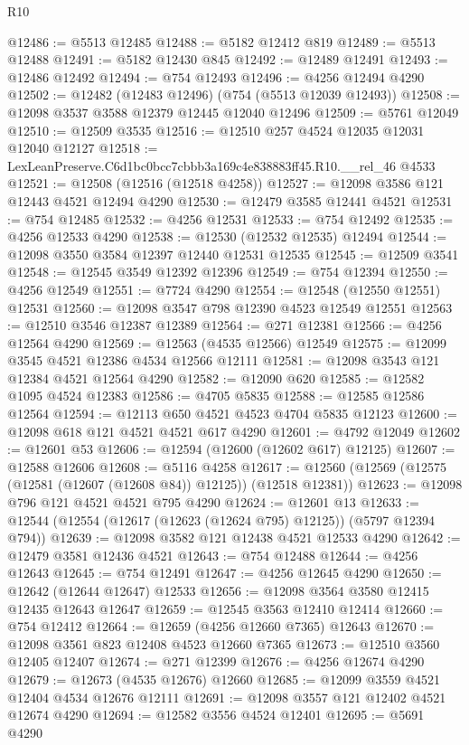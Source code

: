 \begin{lexlean}{R10}
\begin{coremodule}
@12486 := @5513 @12485
@12488 := @5182 @12412 @819
@12489 := @5513 @12488
@12491 := @5182 @12430 @845
@12492 := @12489 @12491
@12493 := @12486 @12492
@12494 := @754 @12493
@12496 := @4256 @12494 @4290
@12502 := @12482 (@12483 @12496) (@754 (@5513 @12039 @12493))
@12508 := @12098 @3537 @3588 @12379 @12445 @12040 @12496
@12509 := @5761 @12049
@12510 := @12509 @3535
@12516 := @12510 @257 @4524 @12035 @12031 @12040 @12127
@12518 := LexLeanPreserve.C6d1bc0bcc7cbbb3a169c4e838883ff45.R10.__rel_46 @4533
@12521 := @12508 (@12516 (@12518 @4258))
@12527 := @12098 @3586 @121 @12443 @4521 @12494 @4290
@12530 := @12479 @3585 @12441 @4521
@12531 := @754 @12485
@12532 := @4256 @12531
@12533 := @754 @12492
@12535 := @4256 @12533 @4290
@12538 := @12530 (@12532 @12535) @12494
@12544 := @12098 @3550 @3584 @12397 @12440 @12531 @12535
@12545 := @12509 @3541
@12548 := @12545 @3549 @12392 @12396
@12549 := @754 @12394
@12550 := @4256 @12549
@12551 := @7724 @4290
@12554 := @12548 (@12550 @12551) @12531
@12560 := @12098 @3547 @798 @12390 @4523 @12549 @12551
@12563 := @12510 @3546 @12387 @12389
@12564 := @271 @12381
@12566 := @4256 @12564 @4290
@12569 := @12563 (@4535 @12566) @12549
@12575 := @12099 @3545 @4521 @12386 @4534 @12566 @12111
@12581 := @12098 @3543 @121 @12384 @4521 @12564 @4290
@12582 := @12090 @620
@12585 := @12582 @1095 @4524 @12383
@12586 := @4705 @5835
@12588 := @12585 @12586 @12564
@12594 := @12113 @650 @4521 @4523 @4704 @5835 @12123
@12600 := @12098 @618 @121 @4521 @4521 @617 @4290
@12601 := @4792 @12049
@12602 := @12601 @53
@12606 := @12594 (@12600 (@12602 @617) @12125)
@12607 := @12588 @12606
@12608 := @5116 @4258
@12617 := @12560 (@12569 (@12575 (@12581 (@12607 (@12608 @84)) @12125)) (@12518 @12381))
@12623 := @12098 @796 @121 @4521 @4521 @795 @4290
@12624 := @12601 @13
@12633 := @12544 (@12554 (@12617 (@12623 (@12624 @795) @12125)) (@5797 @12394 @794))
@12639 := @12098 @3582 @121 @12438 @4521 @12533 @4290
@12642 := @12479 @3581 @12436 @4521
@12643 := @754 @12488
@12644 := @4256 @12643
@12645 := @754 @12491
@12647 := @4256 @12645 @4290
@12650 := @12642 (@12644 @12647) @12533
@12656 := @12098 @3564 @3580 @12415 @12435 @12643 @12647
@12659 := @12545 @3563 @12410 @12414
@12660 := @754 @12412
@12664 := @12659 (@4256 @12660 @7365) @12643
@12670 := @12098 @3561 @823 @12408 @4523 @12660 @7365
@12673 := @12510 @3560 @12405 @12407
@12674 := @271 @12399
@12676 := @4256 @12674 @4290
@12679 := @12673 (@4535 @12676) @12660
@12685 := @12099 @3559 @4521 @12404 @4534 @12676 @12111
@12691 := @12098 @3557 @121 @12402 @4521 @12674 @4290
@12694 := @12582 @3556 @4524 @12401
@12695 := @5691 @4290

\end{coremodule}
\end{lexlean}
